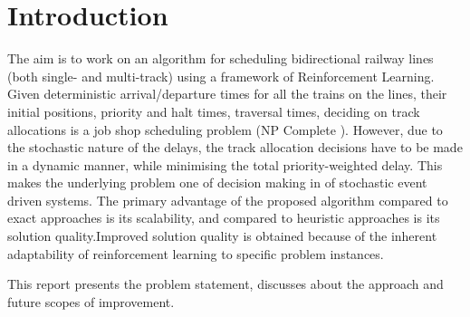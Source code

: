 \titleformat{\chapter}[display]{\normalfont\Large\bfseries}{}{11pt}{\Huge}
\chapter{Introduction}
\hspace{3mm}


The aim is to work on an algorithm for scheduling
bidirectional railway lines (both single- and multi-track) using a
framework of Reinforcement Learning. Given deterministic arrival/departure times for
 all the trains on the lines, their initial positions, 
 priority and halt times, traversal times, deciding on track allocations is a 
 job shop scheduling problem (NP Complete ). However, 
 due to the stochastic nature of the delays, 
 the track allocation decisions have to be made in a dynamic manner, 
 while minimising the total priority-weighted delay. 
 This makes the underlying problem one of decision making in of 
 stochastic event driven systems. 
The
primary advantage of the proposed algorithm compared to
exact approaches is its scalability, and compared to heuristic
approaches is its solution quality.Improved solution quality is obtained because
of the inherent adaptability of reinforcement learning to specific
problem instances.

This report presents the problem statement, discusses about the approach 
and future scopes of improvement.
